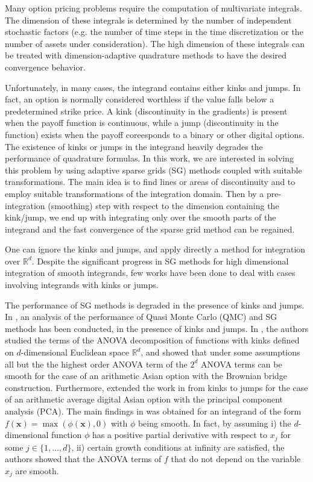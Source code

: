 \documentclass[11pt]{article}
\newcommand{\rset}{\mathbb{R}}
\begin{document}
Many option pricing problems  require the computation of multivariate integrals. The dimension of these integrals
is determined by the number of independent stochastic factors (e.g. the number of time steps in the time discretization or the number of assets under consideration).  The high dimension of these integrals can be treated with dimension-adaptive quadrature methods to have the desired convergence behavior.

Unfortunately, in many cases, the  integrand contains either kinks and jumps. In fact, an option is normally considered worthless if the value falls below a predetermined strike price.  A kink  (discontinuity in the gradients) is present when the payoff function is  continuous, while a jump (discontinuity in the function)  exists when the payoff coreesponds to a binary or other digital options. The existence of kinks or jumps in the integrand  heavily degrades
the performance of quadrature formulas.  In this work, we are interested in solving this problem  by using adaptive  sparse grids (SG) methods coupled with suitable transformations. The main idea is to find lines or areas of discontinuity and to employ suitable transformations of the integration domain. Then  by a pre-integration (smoothing) step with respect to the dimension containing the kink/jump,  we end up with integrating  only over the smooth parts of the integrand and the fast convergence of the sparse grid method can be regained.


One can ignore the kinks and jumps, and apply directly a method for integration over $\rset^d$.  Despite the  significant progress in SG methods \cite{bungartz2004sparse} for high dimensional integration  of  smooth integrands, few works have been done to deal with  cases involving integrands with kinks or jumps.

The performance of SG methods is degraded in the presence of kinks and jumps. In \cite{griebel2013smoothing,griebel2017note,griewank2017high}, an  analysis of   the performance of  Quasi Monte Carlo (QMC) and SG methods has been conducted, in the presence of kinks and jumps.  In \cite{griebel2013smoothing,griebel2017note}, the authors studied the terms of the ANOVA decomposition of functions with kinks defined on $d$-dimensional Euclidean space $\rset^d$, and showed   that under some assumptions all but the the highest order ANOVA term  of the $2^d$ ANOVA terms can be smooth for the case of an arithmetic Asian option with the Brownian bridge construction. Furthermore, \cite{griewank2017high} extended the work in \cite{griebel2013smoothing,griebel2017note} from kinks
to jumps for  the case of an arithmetic average digital Asian option with the principal component analysis (PCA). The main findings in \cite{griebel2013smoothing,griebel2017note} was obtained  for an  integrand  of the form $f(\mathbf{x}) = \max(\phi(\mathbf{x}), 0)$ with $\phi$ being smooth. In fact, by assuming  i) the $d$-dimensional function $\phi$ has a positive partial derivative with respect to $x_j$ for some $j \in \{1,\dots,d\}$, ii) certain growth conditions at infinity are satisfied, the authors showed that the ANOVA terms of $f$ that do not depend on the variable $x_j$ are smooth.
 
\end{document}
